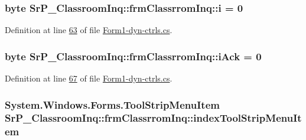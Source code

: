\hypertarget{class_sr_p___classroom_inq_1_1frm_classrrom_inq_aa757c37b373c81fd9ac14b89ad217df0}{
\subsubsection[{i}]{\setlength{\rightskip}{0pt plus 5cm}byte {\bf \-Sr\-P\-\_\-\-Classroom\-Inq\-::frm\-Classrrom\-Inq\-::i} = 0}}
\label{class_sr_p___classroom_inq_1_1frm_classrrom_inq_aa757c37b373c81fd9ac14b89ad217df0}


\-Definition at line \hyperlink{_form1-dyn-ctrls_8cs_source_l00063}{63} of file \hyperlink{_form1-dyn-ctrls_8cs_source}{\-Form1-\/dyn-\/ctrls.\-cs}.

\hypertarget{class_sr_p___classroom_inq_1_1frm_classrrom_inq_a3eefb413ee1ce6cd615c0d1af7cee8d3}{
\subsubsection[{i\-Ack}]{\setlength{\rightskip}{0pt plus 5cm}byte {\bf \-Sr\-P\-\_\-\-Classroom\-Inq\-::frm\-Classrrom\-Inq\-::i\-Ack} = 0}}
\label{class_sr_p___classroom_inq_1_1frm_classrrom_inq_a3eefb413ee1ce6cd615c0d1af7cee8d3}


\-Definition at line \hyperlink{_form1-dyn-ctrls_8cs_source_l00067}{67} of file \hyperlink{_form1-dyn-ctrls_8cs_source}{\-Form1-\/dyn-\/ctrls.\-cs}.

\hypertarget{class_sr_p___classroom_inq_1_1frm_classrrom_inq_a650650a8a1948b902bae347f3cdf9679}{
\subsubsection[{index\-Tool\-Strip\-Menu\-Item}]{\setlength{\rightskip}{0pt plus 5cm}\-System.\-Windows.\-Forms.\-Tool\-Strip\-Menu\-Item {\bf \-Sr\-P\-\_\-\-Classroom\-Inq\-::frm\-Classrrom\-Inq\-::index\-Tool\-Strip\-Menu\-Item}}}
\label{class_sr_p___classroom_inq_1_1frm_classrrom_inq_a650650a8a1948b902bae347f3cdf9679}


